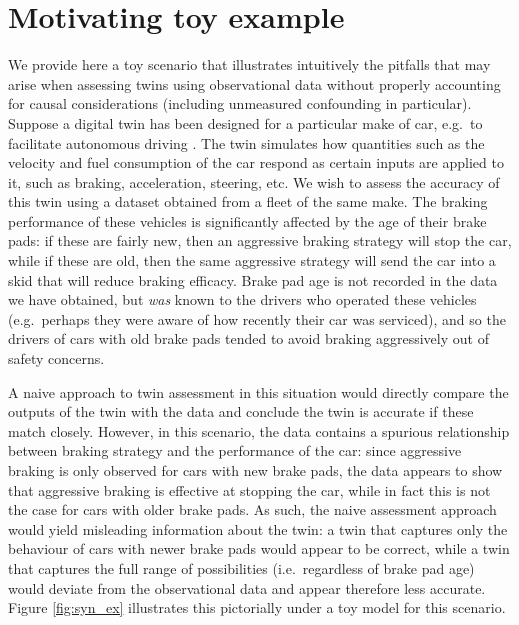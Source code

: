 \section{Motivating toy example} \label{sec:motivating-example}

%
%
We provide here a toy scenario that illustrates intuitively the pitfalls that may arise when assessing twins using observational data without properly accounting for causal considerations (including unmeasured confounding in particular).
%
Suppose a digital twin has been designed for a particular make of car, e.g.\ to facilitate autonomous driving \citep{allamaa2022sim2real}.
The twin simulates how quantities such as the velocity and fuel consumption of the car respond as certain inputs are applied to it, such as braking, acceleration, steering, etc.
We wish to assess the accuracy of this twin using a dataset obtained from a fleet of the same make.
The braking performance of these vehicles is significantly affected by the age of their brake pads: if these are fairly new, then an aggressive braking strategy will stop the car, while if these are old, then the same aggressive strategy will send the car into a skid that will reduce braking efficacy.
Brake pad age is not recorded in the data we have obtained, but \emph{was} known to the drivers who operated these vehicles (e.g.\ perhaps they were aware of how recently their car was serviced), and so the drivers of cars with old brake pads tended to avoid braking aggressively out of safety concerns.

%
%
%

A naive approach to twin assessment in this situation would directly compare the outputs of the twin with the data and conclude the twin is accurate if these match closely.
However, in this scenario, the data contains a spurious relationship between braking strategy and the performance of the car: since aggressive braking is only observed for cars with new brake pads, the data appears to show that aggressive braking is effective at stopping the car, while in fact this is not the case for cars with older brake pads.
As such, the naive assessment approach would yield misleading information about the twin: a twin that captures only the behaviour of cars with newer brake pads would appear to be correct, while a twin that captures the full range of possibilities (i.e.\ regardless of brake pad age) would deviate from the observational data and appear therefore less accurate.
%
%
Figure \ref{fig:syn_ex} illustrates this pictorially under a toy model for this scenario.

